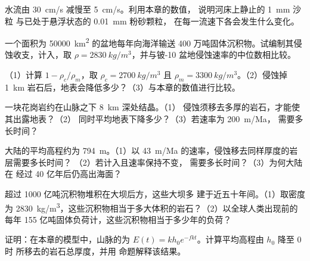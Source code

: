 \begin{exercise}[$\star\star$]\label{exo:g12:destruction-of-mountains:6}
水流由 \qty{30}{cm/s} 减慢至 \qty{5}{cm/s}。利用本章的数值，
说明河床上静止的 \qty{1}{mm} 沙粒
与已处于悬浮状态的 \qty{0.01}{mm} 粉砂颗粒，
在每一流速下各会发生什么变化。
\end{exercise}

\begin{exercise}[$\star\star$]\label{exo:g12:destruction-of-mountains:7}
一个面积为 \qty{50000}{km^2} 的盆地每年向海洋输送
400 万吨固体沉积物。试编制其侵蚀收支，计入，取 $\rho =
\qty{2830}{kg/m^3}$，并与铍-10 盆地侵蚀速率的中位数相比较。
\end{exercise}

\begin{exercise}[$\star\star$]\label{exo:g12:destruction-of-mountains:8}
（1）计算 $1 - \rho_c/\rho_m$，取 $\rho_c = \qty{2700}{kg/m^3}$ 且
$\rho_m = \qty{3300}{kg/m^3}$。（2）侵蚀掉
\qty{1}{km} 岩石后，地表会降低多少？（3）与本章的数值进行比较。
\end{exercise}

\begin{exercise}[$\star\star$]\label{exo:g12:destruction-of-mountains:9}
一块花岗岩约在山脉之下 \qty{8}{km} 深处结晶。（1）
侵蚀须移去多厚的岩石，才能使其出露地表？（2）
同时平均地表下降多少？（3）若速率为 \qty{200}{m/Ma}，
需要多长时间？
\end{exercise}

\begin{exercise}[$\star\star$]\label{exo:g12:destruction-of-mountains:10}
大陆的平均高程约为 \qty{794}{m}。（1）以
\qty{43}{m/Ma} 的速率，侵蚀移去同样厚度的岩层需要多长时间？
（2）若计入且速率保持不变，
需要多长时间？（3）为何大陆在
经过 40 亿年后仍高出海面？
\end{exercise}

\begin{exercise}[$\star\star$]\label{exo:g12:destruction-of-mountains:11}
超过 1000 亿吨沉积物堆积在大坝后方，这些大坝多
建于近五十年间。（1）取密度为
\qty{2830}{kg/m^3}，这些沉积物相当于多大体积的岩石？（2）以全球人类出现前的
每年 155 亿吨固体负荷计，这些沉积物相当于多少年的负荷？
\end{exercise}

\begin{exercise}[$\star\star\star$]\label{exo:g12:destruction-of-mountains:12}
证明：在本章的模型中，山脉的为
$E(t) = k h_0 e^{-fkt}$。计算平均高程由 $h_0$ 降至 0 时
所移去的岩石总厚度，并用
命题解释该结果。
\end{exercise}

